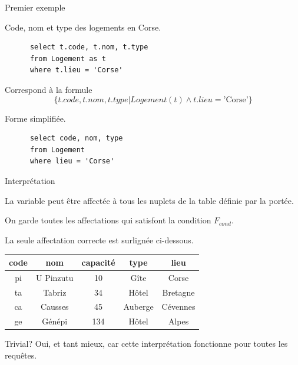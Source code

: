 \begin{frame}[fragile]{Premier exemple}

Code, nom et type des logements en Corse.

\vfill

\begin{verbatim}
      select t.code, t.nom, t.type
      from Logement as t
      where t.lieu = 'Corse'
\end{verbatim}

\vfill

Correspond à la formule
$$\{ t.code, t.nom, t.type | Logement(t) \land t.lieu=\text{'Corse'} \}$$

\vfill

Forme simplifiée. 

\begin{verbatim}
      select code, nom, type
      from Logement
      where lieu = 'Corse'
\end{verbatim}

\end{frame}


\begin{frame}[fragile]{Interprétation}

La variable peut être affectée à tous les nuplets  de la table définie
par la portée.

\vfill

\alert{On garde toutes les affectations qui satisfont la condition $F_{cond}$}.

\vfill

La seule affectation correcte est surlignée ci-dessous.


\begin{center}
\begin{tabular}{c|c|c|c|c}
\textbf{code} & \textbf{nom} & \textbf{capacité} & \textbf{type} & \textbf{lieu}\\ \hline 
\rowcolor{asparagus}
pi & U Pinzutu & 10 & Gîte & Corse\\ \hline 
ta & Tabriz & 34 & Hôtel & Bretagne\\ \hline 
ca & Causses & 45 & Auberge & Cévennes\\ \hline 
ge & Génépi & 134 & Hôtel & Alpes\\ \hline 
\end{tabular}
\end{center}


\begin{blocgauche}
\alert{Trivial?} Oui, et tant mieux, car cette interprétation
fonctionne pour \alert{toutes} les requêtes.
\end{blocgauche}
\end{frame}



